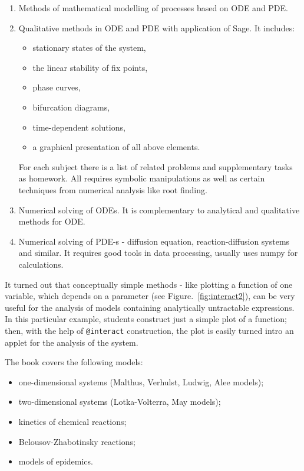 \documentclass{deliverablereport}
\begin{document}
\begin{enumerate}
\item Methods of mathematical modelling of  processes based on ODE and PDE. 
\item Qualitative methods in ODE and PDE with application of Sage. It
  includes:
  \begin{itemize}
  \item stationary states of the system,
  \item the linear stability of fix points,
  \item phase curves,
  \item bifurcation diagrams,
  \item time-dependent solutions,
  \item a graphical  presentation of all above  elements. 
  \end{itemize}
  
  For each subject there is a list of related problems and
  supplementary tasks as homework. All requires symbolic manipulations
  as well as certain techniques from numerical analysis like root
  finding.
  
\item Numerical solving of ODEs. It is complementary to analytical and
  qualitative methods for ODE. 
\item Numerical solving of PDE-s - diffusion equation,
  reaction-diffusion systems and similar. It requires good tools in data
  processing, usually uses numpy for calculations.

\end{enumerate}


It turned out that conceptually simple methods - like plotting a
function of one variable, which depends on a parameter (see
Figure.~\ref{fig:interact2}), can be very useful for the analysis of
models containing analytically untractable expressions. In this
particular example, students construct just a simple plot of a
function; then, with the help of \texttt{@interact} construction, the
plot is easily turned intro an applet for the analysis of the system.

The book covers the following  models: 
 \begin{itemize}
  \item one-dimensional systems (Malthus, Verhulst, Ludwig, Alee models);
  \item two-dimensional systems (Lotka-Volterra, May models);
  \item kinetics of chemical reactions;
  \item Belousov-Zhabotinsky reactions;
  \item models of epidemics.
 \end{itemize}
\end{document}
